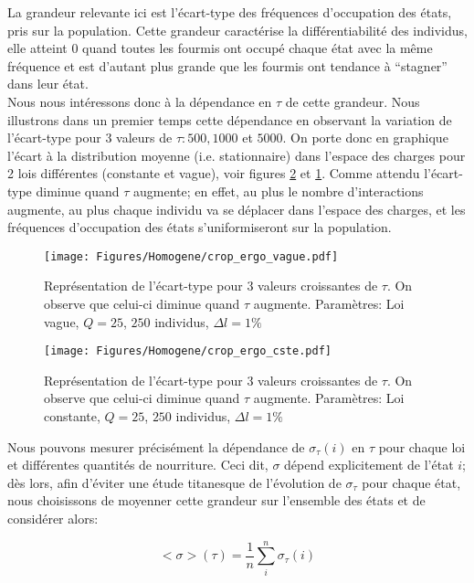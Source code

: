 La grandeur relevante ici est l'écart-type des fréquences d'occupation des états, pris sur la population. Cette grandeur caractérise la différentiabilité des individus, elle atteint 0 quand toutes les fourmis ont occupé chaque état avec la même fréquence et est d'autant plus grande que les fourmis ont tendance à ``stagner'' dans leur état.  \\

Nous nous intéressons donc à la dépendance en $\tau$ de cette grandeur. Nous illustrons dans un premier temps cette dépendance en observant la variation de l'écart-type pour 3 valeurs de $\tau: 500, 1000$ et $5000$. On porte donc en graphique l'écart à la distribution moyenne (i.e. stationnaire) dans l'espace des charges pour 2 lois différentes (constante et vague), voir figures \ref{ergo_cste} et \ref{ergo_vague}. Comme attendu l'écart-type diminue quand $\tau$ augmente; en effet, au plus le nombre d'interactions augmente, au plus chaque individu va se déplacer dans l'espace des charges, et les fréquences d'occupation des états s'uniformiseront sur la population.\\



\begin{figure}[h]
\centering
\texttt{[image: Figures/Homogene/crop\_ergo\_vague.pdf]}
\caption{Représentation de l'écart-type pour 3 valeurs croissantes de $\tau$. On observe que celui-ci diminue quand $\tau$ augmente. Paramètres: Loi vague, $Q=25$, $250$ individus, $\Delta l = 1\%$}
\label{ergo_vague}
\end{figure}

\begin{figure}[h]
\centering
\texttt{[image: Figures/Homogene/crop\_ergo\_cste.pdf]}
\caption{Représentation de l'écart-type pour 3 valeurs croissantes de $\tau$. On observe que celui-ci diminue quand $\tau$ augmente. Paramètres: Loi constante, $Q=25$, $250$ individus, $\Delta l = 1\%$}
\label{ergo_cste}
\end{figure}


Nous pouvons mesurer précisément la dépendance de $\sigma_{\tau}(i)$ en $\tau$ pour chaque loi et différentes quantités de nourriture. Ceci dit, $\sigma$ dépend explicitement de l'état $i$; dès lors, afin d'éviter une étude titanesque de l'évolution de $\sigma_{\tau}$ pour chaque état, nous choisissons de moyenner cette grandeur sur l'ensemble des états et de considérer alors:

\begin{equation}
<\sigma>(\tau)=\frac{1}{n}\sum_i^n \sigma_{\tau}(i)
\label{moySTD}
\end{equation}

